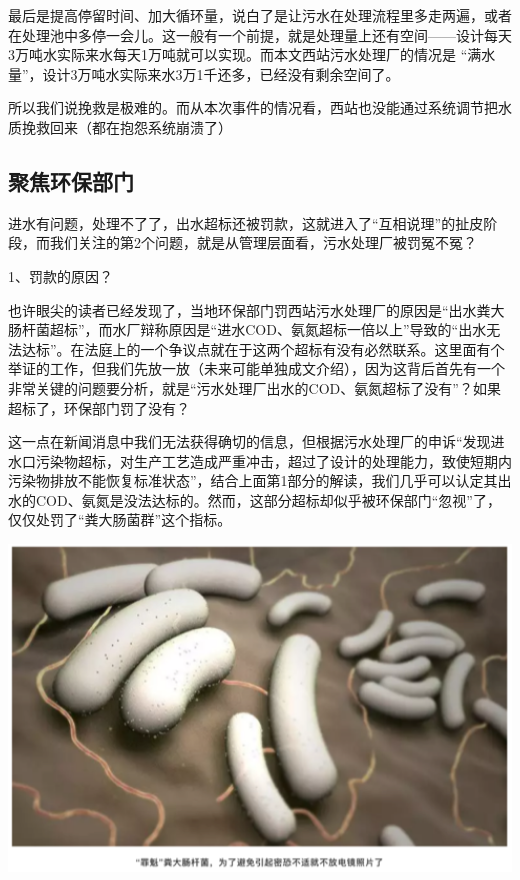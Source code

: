 \documentclass[]{book}
\begin{document}
最后是提高停留时间、加大循环量，说白了是让污水在处理流程里多走两遍，或者在处理池中多停一会儿。这一般有一个前提，就是处理量上还有空间------设计每天3万吨水实际来水每天1万吨就可以实现。而本文西站污水处理厂的情况是 ``满水量''，设计3万吨水实际来水3万1千还多，已经没有剩余空间了。

所以我们说挽救是极难的。而从本次事件的情况看，西站也没能通过系统调节把水质挽救回来（都在抱怨系统崩溃了）

\hypertarget{ux805aux7126ux73afux4fddux90e8ux95e8}{%
\subsection{聚焦环保部门}\label{ux805aux7126ux73afux4fddux90e8ux95e8}}

进水有问题，处理不了了，出水超标还被罚款，这就进入了``互相说理''的扯皮阶段，而我们关注的第2个问题，就是从管理层面看，污水处理厂被罚冤不冤？

1、罚款的原因？

也许眼尖的读者已经发现了，当地环保部门罚西站污水处理厂的原因是``出水粪大肠杆菌超标''，而水厂辩称原因是``进水COD、氨氮超标一倍以上''导致的``出水无法达标''。在法庭上的一个争议点就在于这两个超标有没有必然联系。这里面有个举证的工作，但我们先放一放（未来可能单独成文介绍），因为这背后首先有一个非常关键的问题要分析，就是``污水处理厂出水的COD、氨氮超标了没有''？如果超标了，环保部门罚了没有？

这一点在新闻消息中我们无法获得确切的信息，但根据污水处理厂的申诉``发现进水口污染物超标，对生产工艺造成严重冲击，超过了设计的处理能力，致使短期内污染物排放不能恢复标准状态''，结合上面第1部分的解读，我们几乎可以认定其出水的COD、氨氮是没法达标的。然而，这部分超标却似乎被环保部门``忽视''了，仅仅处罚了``粪大肠菌群''这个指标。

\includegraphics[width=6.67in]{images/py2}
\end{document}
